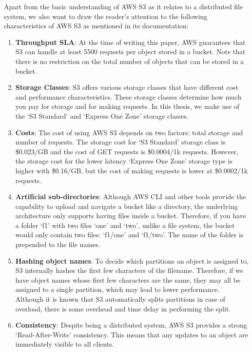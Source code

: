 \medskip
Apart from the basic understanding of AWS S3 as it relates to a distributed
file system, we also want to draw the reader's attention to the following
characteristics of AWS S3 as mentioned in its documentation:
\begin{enumerate}
    \item \textbf{Throughput SLA}: At the time of writing this paper, AWS
        guarantees that S3 can handle at least 5500 requests per object stored
        in a bucket. Note that there is no restriction on the total number of
        objects that can be stored in a bucket.
    \item \textbf{Storage Classes}: S3 offers various storage classes that have
        different cost and performance characteristics. These storage classes
        determine how much you pay for storage and for making requests. In this
        thesis, we make use of the `S3 Standard' and `Express One Zone' storage
        classes.
    \item \textbf{Costs}: The cost of using AWS S3 depends on two factors: total
        storage and number of requests. The storage cost for `S3 Standard'
        storage class is \$0.023/GB and the cost of GET requests is
        \$0.0004/1k requests. However, the storage cost for the lower latency
        `Express One Zone' storage type is higher with \$0.16/GB, but the cost of making
        requests is lower at \$0.0002/1k requests. 
    \item \textbf{Artificial sub-directories}: Although AWS CLI and other tools
        provide the capability to upload and navigate a bucket like a directory,
        the underlying architecture only supports having files inside a
        bucket. Therefore, if you have a folder `f1' with two files `one' and
        `two', unlike a file system, the bucket would only contain two files:
        `f1/one' and `f1/two'. The name of the folder is
        prepended to the file names.
    \item \textbf{Hashing object names}: To decide which partitions an
        object is assigned to, S3 internally hashes the first few characters of
        the filename. Therefore, if we have object names whose first few
        characters are the same, they may all be assigned to a
        single partition, which may lead to lower performance. Although it is
        known that S3 automatically splits partitions in case of overload,
        there is some overhead and time delay in performing the split.
    \item \textbf{Consistency}: Despite being a distributed system, AWS S3
        provides a strong `Read-After-Write' consistency. This means that any
        updates to an object are immediately visible to all clients.
\end{enumerate}

